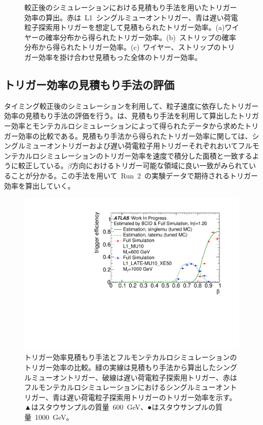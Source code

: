 \begin{figure}[tbp]
\begin{minipage}{0.99\hsize}
    \subcaption{}
    \end{minipage}
    \caption[較正後のシミュレーションにおける見積もり手法を用いたトリガー効率の算出]{較正後のシミュレーションにおける見積もり手法を用いたトリガー効率の算出。赤は~L1~シングルミューオントリガー、青は遅い荷電粒子探索用トリガーを想定して見積もられたトリガー効率。(a)ワイヤーの確率分布から得られたトリガー効率。(b)~ストリップの確率分布から得られたトリガー効率。(c)~ワイヤー、ストリップのトリガー効率を掛け合わせ見積もった全体のトリガー効率。}\label{fig:efftune}
\end{figure}


\subsection{トリガー効率の見積もり手法の評価}\label{chap:caltri}
タイミング較正後のシミュレーションを利用して、粒子速度に依存したトリガー効率の見積もり手法の評価を行う。は、見積もり手法を利用して算出したトリガー効率とモンテカルロシミュレーションによって得られたデータから求めたトリガー効率の比較である。見積もり手法から得られたトリガー効率に関しては、シングルミューオントリガーおよび遅い荷電粒子用トリガーそれぞれおいてフルモンテカルロシミュレーションのトリガー効率を速度で積分した面積と一致するように較正している。$\beta$方向におけるトリガー可能な領域に良い一致がみられていることが分かる。この手法を用いて~Run~2~の実験データで期待されるトリガー効率を算出していく。

\begin{figure}[tbp]
    \centering   
    \includegraphics[width=\textwidth,page=1]{img/rec/vs.pdf}
    \caption[トリガー効率見積もり手法とフルモンテカルロシミュレーションのトリガー効率の比較]{トリガー効率見積もり手法とフルモンテカルロシミュレーションのトリガー効率の比較。緑の実線は見積もり手法から算出したシングルミューオントリガー、破線は遅い荷電粒子探索用トリガー、赤はフルモンテカルロシミュレーションにおけるシングルミューオントリガー、青は遅い荷電粒子探索用トリガーのトリガー効率を示す。▲はスタウサンプルの質量~600~GeV、●はスタウサンプルの質量~1000~GeV。}\label{fig:comp}
\end{figure}

